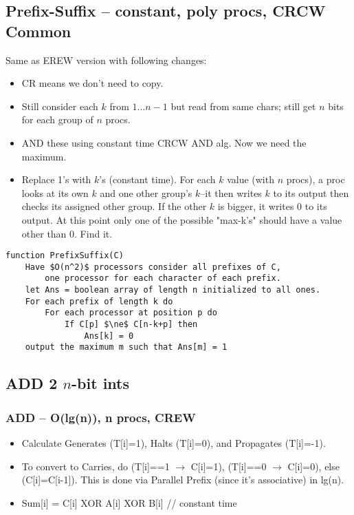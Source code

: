 \documentclass[12pt]{article}
\providecommand{\tightlist}{
    \setlength{\itemsep}{0pt}\setlength{\parskip}{0pt}
}
\begin{document}
\subsection{Prefix-Suffix -- constant, poly procs, CRCW Common}
Same as EREW version with following changes:\\
\begin{itemize}\tightlist
  \item CR means we don't need to copy.
  \item Still consider each $k$ from $1 \dots n-1$ but read from same chars; still get $n$ bits for each group of $n$ procs.
  \item AND these using constant time CRCW AND alg. Now we need the maximum.
  \item Replace 1's with $k$'s (constant time). For each $k$ value (with $n$ procs), a proc looks at its own $k$ and one other group's $k$--it then writes $k$ to its output then checks its assigned other group. If the other $k$ is bigger, it writes 0 to its output. At this point only one of the possible "max-k's" should have a value other than 0. Find it.
\end{itemize}
\begin{lstlisting}
function PrefixSuffix(C)
    Have $O(n^2)$ processors consider all prefixes of C,
        one processor for each character of each prefix.
    let Ans = boolean array of length n initialized to all ones.
    For each prefix of length k do
        For each processor at position p do
            If C[p] $\ne$ C[n-k+p] then
                Ans[k] = 0
    output the maximum m such that Ans[m] = 1
\end{lstlisting}


\subsection{ADD 2 $n$-bit ints}
\subsubsection{ADD -- O(lg(n)), n procs, CREW}
\begin{itemize}\tightlist
  \item Calculate Generates (T[i]=1), Halts (T[i]=0), and Propagates (T[i]=-1).
  \item To convert to Carries, do (T[i]==1 $\rightarrow$ C[i]=1), (T[i]==0 $\rightarrow$ C[i]=0), else (C[i]=C[i-1]).
  This is done via Parallel Prefix (since it's associative) in lg(n).
  \item Sum[i] = C[i] XOR A[i] XOR B[i]   // constant time
\end{itemize}
\end{document}
